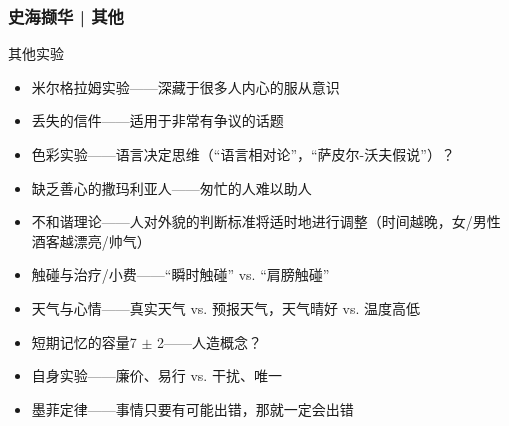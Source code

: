 \begin{frame}
  \frametitle{史海撷华 | 其他}
  \begin{block}{其他实验}
    \begin{itemize}
      \item 米尔格拉姆实验——深藏于很多人内心的服从意识
      \item 丢失的信件——适用于非常有争议的话题
      \item 色彩实验——语言决定思维（“语言相对论”，“萨皮尔-沃夫假说”）？
      \item 缺乏善心的撒玛利亚人——匆忙的人难以助人
      \item 不和谐理论——人对外貌的判断标准将适时地进行调整（时间越晚，女/男性酒客越漂亮/帅气）
      \item 触碰与治疗/小费——“瞬时触碰” vs. “肩膀触碰”
      \item 天气与心情——真实天气 vs. 预报天气，天气晴好 vs. 温度高低
      \item 短期记忆的容量7 $\pm$ 2——人造概念？
      \item 自身实验——廉价、易行 vs. 干扰、唯一
      \item 墨菲定律——事情只要有可能出错，那就一定会出错
    \end{itemize}
  \end{block}
\end{frame}



